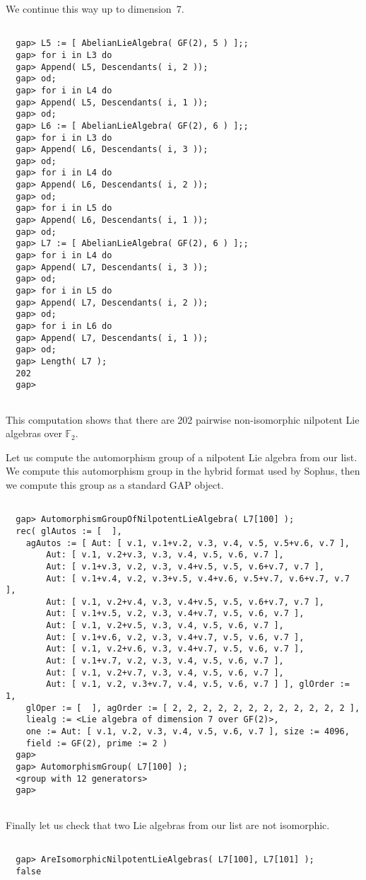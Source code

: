 \documentclass[11pt]{report}
\begin{document}
{We continue this way up to dimension~7. 
\begin{Verbatim}[fontsize=\small,frame=single,label=Example]
  
  gap> L5 := [ AbelianLieAlgebra( GF(2), 5 ) ];;
  gap> for i in L3 do
  gap> Append( L5, Descendants( i, 2 ));
  gap> od;
  gap> for i in L4 do
  gap> Append( L5, Descendants( i, 1 ));
  gap> od;
  gap> L6 := [ AbelianLieAlgebra( GF(2), 6 ) ];;
  gap> for i in L3 do
  gap> Append( L6, Descendants( i, 3 ));
  gap> od;
  gap> for i in L4 do
  gap> Append( L6, Descendants( i, 2 ));
  gap> od;
  gap> for i in L5 do
  gap> Append( L6, Descendants( i, 1 ));
  gap> od;
  gap> L7 := [ AbelianLieAlgebra( GF(2), 6 ) ];;
  gap> for i in L4 do
  gap> Append( L7, Descendants( i, 3 ));
  gap> od;
  gap> for i in L5 do
  gap> Append( L7, Descendants( i, 2 ));
  gap> od;
  gap> for i in L6 do
  gap> Append( L7, Descendants( i, 1 ));
  gap> od;
  gap> Length( L7 );
  202
  gap>
  
\end{Verbatim}
 

This computation shows that there are 202 pairwise non-isomorphic nilpotent
Lie algebras over $\mathbb F_2$. 

 Let us compute the automorphism group of a nilpotent Lie algebra from our
list. We compute this automorphism group in the hybrid format used by \textsf{Sophus}, then we compute this group as a standard \textsf{GAP} object. 
\begin{Verbatim}[fontsize=\small,frame=single,label=Example]
  
  gap> AutomorphismGroupOfNilpotentLieAlgebra( L7[100] );
  rec( glAutos := [  ], 
    agAutos := [ Aut: [ v.1, v.1+v.2, v.3, v.4, v.5, v.5+v.6, v.7 ], 
        Aut: [ v.1, v.2+v.3, v.3, v.4, v.5, v.6, v.7 ], 
        Aut: [ v.1+v.3, v.2, v.3, v.4+v.5, v.5, v.6+v.7, v.7 ], 
        Aut: [ v.1+v.4, v.2, v.3+v.5, v.4+v.6, v.5+v.7, v.6+v.7, v.7 ], 
        Aut: [ v.1, v.2+v.4, v.3, v.4+v.5, v.5, v.6+v.7, v.7 ], 
        Aut: [ v.1+v.5, v.2, v.3, v.4+v.7, v.5, v.6, v.7 ], 
        Aut: [ v.1, v.2+v.5, v.3, v.4, v.5, v.6, v.7 ], 
        Aut: [ v.1+v.6, v.2, v.3, v.4+v.7, v.5, v.6, v.7 ], 
        Aut: [ v.1, v.2+v.6, v.3, v.4+v.7, v.5, v.6, v.7 ], 
        Aut: [ v.1+v.7, v.2, v.3, v.4, v.5, v.6, v.7 ], 
        Aut: [ v.1, v.2+v.7, v.3, v.4, v.5, v.6, v.7 ], 
        Aut: [ v.1, v.2, v.3+v.7, v.4, v.5, v.6, v.7 ] ], glOrder := 1, 
    glOper := [  ], agOrder := [ 2, 2, 2, 2, 2, 2, 2, 2, 2, 2, 2, 2 ], 
    liealg := <Lie algebra of dimension 7 over GF(2)>, 
    one := Aut: [ v.1, v.2, v.3, v.4, v.5, v.6, v.7 ], size := 4096, 
    field := GF(2), prime := 2 )
  gap> 
  gap> AutomorphismGroup( L7[100] );                     
  <group with 12 generators>
  gap> 
  
\end{Verbatim}
 

 Finally let us check that two Lie algebras from our list are not isomorphic. 
\begin{Verbatim}[fontsize=\small,frame=single,label=Example]
  
  gap> AreIsomorphicNilpotentLieAlgebras( L7[100], L7[101] );
  false
  
\end{Verbatim}
 }
\end{document}
